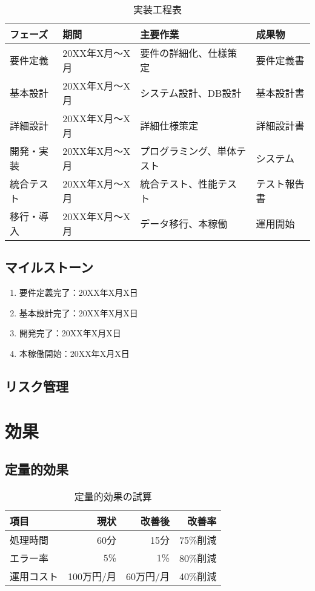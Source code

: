 \documentclass[12pt,a4paper]{jsarticle}
\begin{document}
\begin{table}[h]
\centering
\caption{実装工程表}
\begin{tabular}{|l|l|l|l|}
\hline
\textbf{フェーズ} & \textbf{期間} & \textbf{主要作業} & \textbf{成果物} \\
\hline
要件定義 & 20XX年X月～X月 & 要件の詳細化、仕様策定 & 要件定義書 \\
\hline
基本設計 & 20XX年X月～X月 & システム設計、DB設計 & 基本設計書 \\
\hline
詳細設計 & 20XX年X月～X月 & 詳細仕様策定 & 詳細設計書 \\
\hline
開発・実装 & 20XX年X月～X月 & プログラミング、単体テスト & システム \\
\hline
統合テスト & 20XX年X月～X月 & 統合テスト、性能テスト & テスト報告書 \\
\hline
移行・導入 & 20XX年X月～X月 & データ移行、本稼働 & 運用開始 \\
\hline
\end{tabular}
\end{table}

\subsection{マイルストーン}
\begin{enumerate}
    \item 要件定義完了：20XX年X月X日
    \item 基本設計完了：20XX年X月X日
    \item 開発完了：20XX年X月X日
    \item 本稼働開始：20XX年X月X日
\end{enumerate}

\subsection{リスク管理}

\section{効果}

\subsection{定量的効果}
\begin{table}[h]
\centering
\caption{定量的効果の試算}
\begin{tabular}{|l|r|r|r|}
\hline
\textbf{項目} & \textbf{現状} & \textbf{改善後} & \textbf{改善率} \\
\hline
処理時間 & 60分 & 15分 & 75\%削減 \\
\hline
エラー率 & 5\% & 1\% & 80\%削減 \\
\hline
運用コスト & 100万円/月 & 60万円/月 & 40\%削減 \\
\hline
\end{tabular}
\end{table}
\end{document}
